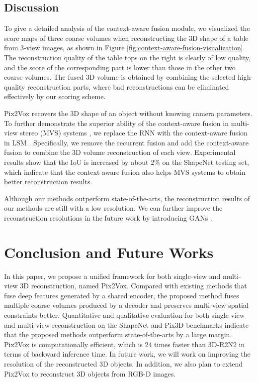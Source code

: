\documentclass[10pt,twocolumn,letterpaper]{article}
\begin{document}
\subsection{Discussion}

To give a detailed analysis of the context-aware fusion module, we visualized the score maps of three coarse volumes when reconstructing the 3D shape of a table from 3-view images, as shown in Figure \ref{fig:context-aware-fusion-visualization}.
The reconstruction quality of the table tops on the right is clearly of low quality, and the score of the corresponding part is lower than those in the other two coarse volumes.
The fused 3D volume is obtained by combining the selected high-quality reconstruction parts, where bad reconstructions can be eliminated effectively by our scoring scheme.

Pix2Vox recovers the 3D shape of an object without knowing camera parameters.
To further demonstrate the superior ability of the context-aware fusion in multi-view stereo (MVS) systems \cite{DBLP:conf/cvpr/SeitzCDSS06}, we replace the RNN with the context-aware fusion in LSM \cite{DBLP:conf/nips/KarHM17}.
Specifically, we remove the recurrent fusion and add the context-aware fusion to combine the 3D volume reconstruction of each view.
Experimental results show that the IoU is increased by about 2\% on the ShapeNet testing set, which indicate that the context-aware fusion also helps MVS systems to obtain better reconstruction results.

Although our methods outperform state-of-the-arts, the reconstruction results of our methods are still with a low resolution.
We can further improve the reconstruction resolutions in the future work by introducing GANs \cite{DBLP:conf/nips/GoodfellowPMXWOCB14}.

\section{Conclusion and Future Works}

In this paper, we propose a unified framework for both single-view and multi-view 3D reconstruction, named Pix2Vox.
Compared with existing methods that fuse deep features generated by a shared encoder, the proposed method fuses multiple coarse volumes produced by a decoder and preserves multi-view spatial constraints better.
Quantitative and qualitative evaluation for both single-view and multi-view reconstruction on the ShapeNet and Pix3D benchmarks indicate that the proposed methods outperform state-of-the-arts by a large margin.
Pix2Vox is computationally efficient, which is 24 times faster than 3D-R2N2 in terms of backward inference time.
In future work, we will work on improving the resolution of the reconstructed 3D objects.
In addition, we also plan to extend Pix2Vox to reconstruct 3D objects from RGB-D images.
\end{document}
